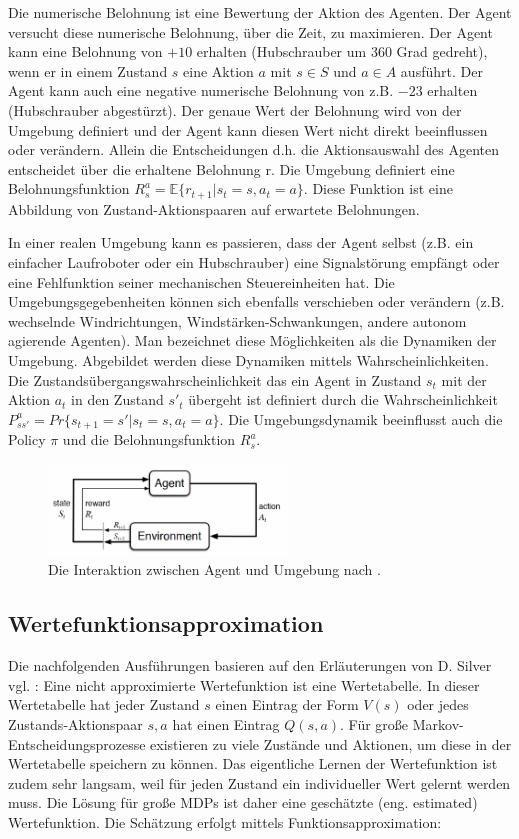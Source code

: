 \documentclass[conference]{IEEEtran}
\begin{document}
Die numerische Belohnung ist eine Bewertung der Aktion des Agenten. Der Agent versucht diese numerische Belohnung, über die Zeit, zu maximieren. Der Agent kann eine Belohnung von $+10$ erhalten (Hubschrauber um 360 Grad gedreht), wenn er in einem Zustand $s$ eine Aktion $a$ mit $s\in S$ und $a\in A$ ausführt. Der Agent kann auch eine negative numerische Belohnung von z.B. $-23$ erhalten (Hubschrauber abgestürzt). Der genaue Wert der Belohnung wird von der Umgebung definiert und der Agent kann diesen Wert nicht direkt beeinflussen oder verändern. Allein die Entscheidungen d.h. die Aktionsauswahl des Agenten entscheidet über die erhaltene Belohnung r. Die Umgebung definiert eine Belohnungsfunktion $R_s^a = \mathbb{E}\{ r_{t+1} | s_t = s, a_t = a \}$. Diese Funktion ist eine Abbildung von Zustand-Aktionspaaren auf erwartete Belohnungen.

In einer realen Umgebung kann es passieren, dass der Agent selbst (z.B. ein einfacher Laufroboter oder ein Hubschrauber) eine Signalstörung empfängt oder eine Fehlfunktion seiner mechanischen Steuereinheiten hat. Die Umgebungsgegebenheiten können sich ebenfalls verschieben oder verändern (z.B. wechselnde Windrichtungen, Windstärken-Schwankungen, andere autonom agierende Agenten). Man bezeichnet diese Möglichkeiten als die Dynamiken der Umgebung. Abgebildet werden diese Dynamiken mittels Wahrscheinlichkeiten. Die Zustandsübergangswahrscheinlichkeit das ein Agent in Zustand $s_t$ mit der Aktion $a_t$ in den Zustand $s'_t$ übergeht ist definiert durch die Wahrscheinlichkeit $P^a_{ss'} = Pr \{ s_{t+1} = s' | s_t = s, a_t = a \}.$ Die Umgebungsdynamik beeinflusst auch die Policy $\pi$ und die Belohnungsfunktion $R^a_s$.

\begin{figure}[!t]
\centering
\includegraphics[width=2.5in]{agent_environment}
\caption{Die Interaktion zwischen Agent und Umgebung nach \cite{sutton_barto_12}.}
\label{agent_environment}
\end{figure}

\subsection{Wertefunktionsapproximation}
Die nachfolgenden Ausführungen basieren auf den Erläuterungen von D. Silver vgl. \cite{silver_15}: Eine nicht approximierte Wertefunktion ist eine Wertetabelle. In dieser Wertetabelle hat jeder Zustand $s$ einen Eintrag der Form $V(s)$ oder jedes Zustands-Aktionspaar $s, a$ hat einen Eintrag $Q(s,a)$. Für große Markov-Entscheidungsprozesse existieren zu viele Zustände und Aktionen, um diese in der Wertetabelle speichern zu können. Das eigentliche Lernen der Wertefunktion ist zudem sehr langsam, weil für jeden Zustand ein individueller Wert gelernt werden muss. Die Lösung für große MDPs ist daher eine geschätzte (eng. estimated) Wertefunktion. Die Schätzung erfolgt mittels Funktionsapproximation:
\end{document}
